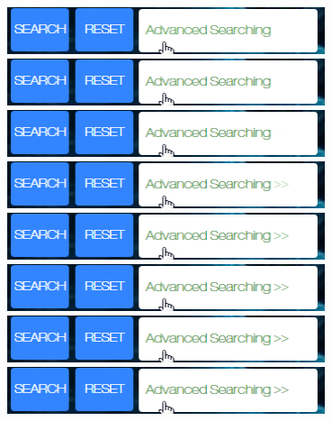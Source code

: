 \documentclass[10pt,twoside,a4paper,titlepage]{article}
\begin{document}
	\newline	
	\includegraphics[width=0.7\textwidth]{cyf/Advanced_searching12.png}
	\newline	
	\includegraphics[width=0.7\textwidth]{cyf/Advanced_searching13.png}
	\newline	
	\includegraphics[width=0.7\textwidth]{cyf/Advanced_searching14.png}
	\newline	
	\includegraphics[width=0.7\textwidth]{cyf/Advanced_searching15.png}
	\newline	
	\includegraphics[width=0.7\textwidth]{cyf/Advanced_searching16.png}
	\newline	
	\includegraphics[width=0.7\textwidth]{cyf/Advanced_searching17.png}
	\newline	
	\includegraphics[width=0.7\textwidth]{cyf/Advanced_searching18.png}
	\newline	
	\includegraphics[width=0.7\textwidth]{cyf/Advanced_searching19.png}
	\newline	
\end{document}
